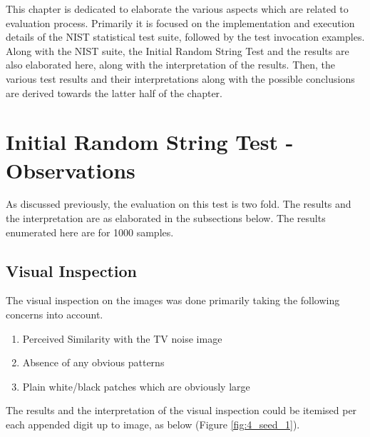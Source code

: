This chapter is dedicated to elaborate the various aspects which are related to evaluation process. Primarily it is focused on the implementation and execution details of the NIST statistical test suite, followed by the test invocation examples. Along with the NIST suite, the Initial Random String Test and the results are also elaborated here, along with the interpretation of the results. Then, the various test results and their interpretations along with the possible conclusions are derived towards the latter half of the chapter.

\section{Initial Random String Test - Observations}

As discussed previously, the evaluation on this test is two fold. The results and the interpretation are as elaborated in the subsections below. The results enumerated here are for 1000 samples.

\subsection{Visual Inspection}

The visual inspection on the images was done primarily taking the following concerns into account.

\begin{enumerate}
    \item Perceived Similarity with the TV noise image
    \item Absence of any obvious patterns
    \item Plain white/black patches which are obviously large
\end{enumerate}

The results and the interpretation of the visual inspection could be itemised per each appended digit up to  image, as below (Figure \ref{fig:4_seed_1}).

